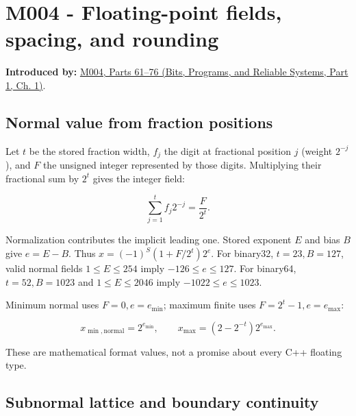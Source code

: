 \section{M004 - Floating-point fields, spacing, and rounding}\label{03-visual-computing-i-ch018-m004---floating-point-fields-spacing-and-rounding}

\hypertarget{03-visual-computing-i-ch018-m004---floating-point-fields-spacing-and-rounding}{}

\textbf{Introduced by:} \href{../01-Bits-Programs-and-Reliable-Systems-P01/main.pdf\#nameddest=01-foundations-i-ch001-a-stretching-ruler-for-real-valued-quantities}{M004, Parts 61--76 (Bits, Programs, and Reliable Systems, Part 1, Ch. 1)}.

\subsection{Normal value from fraction positions}\label{03-visual-computing-i-ch018-normal-value-from-fraction-positions}

\hypertarget{03-visual-computing-i-ch018-normal-value-from-fraction-positions}{}

Let \(t\) be the stored fraction width, \(f_j\) the digit at fractional position \(j\) (weight \(2^{-j}\)), and \(F\) the unsigned integer represented by those digits. Multiplying their fractional sum by \(2^t\) gives the integer field:

\[
\sum_{j=1}^{t}f_j2^{-j}=\frac{F}{2^t}.
\]

Normalization contributes the implicit leading one. Stored exponent \(E\) and bias \(B\) give \(e=E-B\). Thus \(x=(-1)^S(1+F/2^t)2^e\). For binary32, \(t=23,B=127\), valid normal fields \(1\le E\le254\) imply \(-126\le e\le127\). For binary64, \(t=52,B=1023\) and \(1\le E\le2046\) imply \(-1022\le e\le1023\).

Minimum normal uses \(F=0,e=e_{\min}\); maximum finite uses \(F=2^t-1,e=e_{\max}\):

\[
x_{\min,\mathrm{normal}}=2^{e_{\min}},\qquad
x_{\max}=(2-2^{-t})2^{e_{\max}}.
\]

These are mathematical format values, not a promise about every C++ floating type.

\subsection{Subnormal lattice and boundary continuity}\label{03-visual-computing-i-ch018-subnormal-lattice-and-boundary-continuity}

